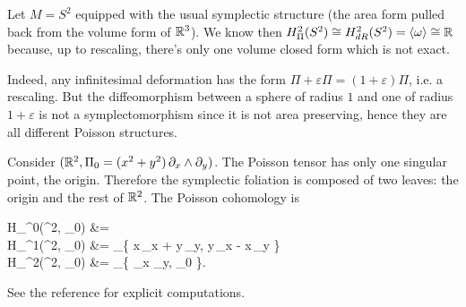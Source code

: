 \documentclass[main.tex]{subfiles}
\begin{document}
\begin{example}
	Let $M=S^2$ equipped with the usual symplectic structure (the area form pulled back from the volume form of $\mathbb{R}^3$). We know then $H^2_\Pi(S^2) \overset{}{\cong} H^2_{dR}(S^2) =\langle \omega \rangle \overset{}{\cong} \mathbb{R}$ because, up to rescaling, there's only one volume closed form which is not exact.

	Indeed, any infinitesimal deformation has the form $\Pi + \varepsilon \Pi = (1+\varepsilon)\Pi$, i.e. a rescaling. But the diffeomorphism between a sphere of radius $1$ and one of radius $1+\varepsilon$ is not a symplectomorphism since it is not area preserving, hence they are all different Poisson structures.
\end{example}

\begin{example}
	Consider $(\mathbb{R}^2, \Pi_0 = (x^2+y^2)\,\partial_x \wedge \partial_y)$. The Poisson tensor has only one singular point, the origin. Therefore the symplectic foliation is composed of two leaves: the origin and the rest of $\mathbb{R}^2$. The Poisson cohomology is
	\begin{eqalign}
		H_\Pi^0(\R^2, \Pi_0) &= \R {}\\
		H_\Pi^1(\R^2, \Pi_0) &= _\R \{ x\,\partial_x + y\,\partial_y,\; y\,\partial_x - x\,\partial_y \}\\
		H_\Pi^2(\R^2, \Pi_0) &= _\R \{ \partial_x \wedge \partial_y,\; \Pi_0 \}.
	\end{eqalign}
	See the reference for explicit computations.
\end{example}
\end{document}

